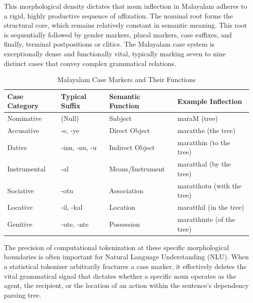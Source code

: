 \documentclass[12pt]{article}
\begin{document}
	This morphological density dictates that noun inflection in Malayalam adheres to a rigid, highly productive sequence of affixation. The nominal root forms the structural core, which remains relatively constant in semantic meaning. This root is sequentially followed by gender markers, plural markers, case suffixes, and finally, terminal postpositions or clitics. The Malayalam case system is exceptionally dense and functionally vital, typically marking seven to nine distinct cases that convey complex grammatical relations.
	
	\begin{table}[h]
		\centering
		\begin{tabular}{llll}
			\toprule
			\textbf{Case Category} & \textbf{Typical Suffix} & \textbf{Semantic Function} & \textbf{Example Inflection} \\
			\midrule
			Nominative   & (Null)           & Subject          & maraM (tree) \\
			Accusative   & -e, -ye          & Direct Object    & maratthe (the tree) \\
			Dative       & -inu, -nu, -u    & Indirect Object  & maratthin (to the tree) \\
			Instrumental & -al              & Means/Instrument & maratthal (by the tree) \\
			Sociative    & -otu             & Association      & maratthotu (with the tree) \\
			Locative     & -il, -kal        & Location         & maratthil (in the tree) \\
			Genitive     & -ute, -nte       & Possession       & maratthinte (of the tree) \\
			\bottomrule
		\end{tabular}
		\caption{Malayalam Case Markers and Their Functions}
		\label{tab:malayalam_cases}
	\end{table}
	
	The precision of computational tokenization at these specific morphological boundaries is often important for Natural Language Understanding (NLU). When a statistical tokenizer arbitrarily fractures a case marker, it effectively deletes the vital grammatical signal that dictates whether a specific noun operates as the agent, the recipient, or the location of an action within the sentence's dependency parsing tree. \cite{asudevi2019malayalam, nimal2017malayalamnounverb, asudevi2023acquisition}
	
\end{document}
